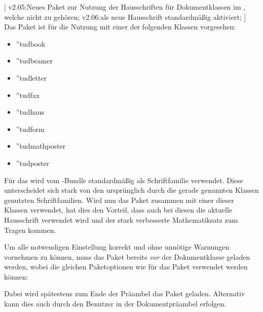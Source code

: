 \begin{DeclareEntity}{}
[
  v2.05:Neues Paket zur Nutzung der Hausschriften für Dokumentklassen im 
  \TUDCD, welche nicht zu \TUDScript gehören;
  v2.06:\OpenSans als neue Hausschrift standardmäßig aktiviert;
]
Das Paket  ist für die Nutzung mit einer der folgenden 
Klassen vorgesehen:
\begin{itemize}
\item \Class''{tudbook}
\item \Class''{tudbeamer}
\item \Class''{tudletter}
\item \Class''{tudfax}
\item \Class''{tudhaus}
\item \Class''{tudform}
\item \Class''{tudmathposter}
\item \Class''{tudposter}
\end{itemize}
%
Für das \TUDCD wird vom \TUDScript-Bundle standardmäßig \OpenSans als 
Schriftfamilie verwendet. Diese unterscheidet sich stark von den ursprünglich 
durch die gerade genannten Klassen genutzten Schriftfamilien. Wird nun das 
Paket  zusammen mit einer dieser Klassen verwendet, 
hat dies den Vorteil, dass auch bei diesen die aktuelle Hausschrift verwendet 
wird und der stark verbesserte Mathematiksatz zum Tragen kommen.

Um alle notwendigen Einstellung korrekt und ohne unnötige Warnungen vornehmen 
zu können, muss das Paket  bereits \emph{vor} der 
Dokumentklasse geladen werden, wobei die gleichen Paketoptionen wie für das 
Paket  verwendet werden können:
%
\begin{quoting}[rightmargin=0pt]
\end{quoting}
%
Dabei wird spätestens zum Ende der Präambel das Paket  
geladen. Alternativ kann dies auch durch den Benutzer in der Dokumentpräambel 
erfolgen.
\end{DeclareEntity}

